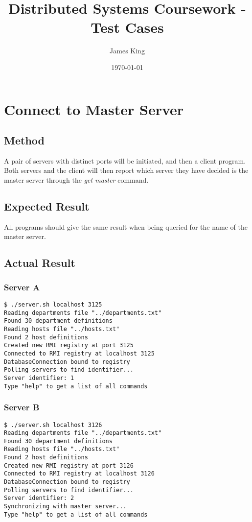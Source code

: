 \documentclass[a4paper,11pt]{article}
\title{Distributed Systems Coursework - Test Cases}
\date{\today}
\author{James King}
\begin{document}
\maketitle
\section{Connect to Master Server}
\subsection{Method}
A pair of servers with distinct ports will be initiated, and then a client program. Both servers and the client will then report which server they have decided is the master server through the \emph{get master} command.

\subsection{Expected Result}
All programs should give the same result when being queried for the name of the master server.

\subsection{Actual Result}
\subsubsection{Server A}
\begin{verbatim}
$ ./server.sh localhost 3125
Reading departments file "../departments.txt"
Found 30 department definitions
Reading hosts file "../hosts.txt"
Found 2 host definitions
Created new RMI registry at port 3125
Connected to RMI registry at localhost 3125
DatabaseConnection bound to registry
Polling servers to find identifier...
Server identifier: 1
Type "help" to get a list of all commands
\end{verbatim}

\subsubsection{Server B}
\begin{verbatim}
$ ./server.sh localhost 3126
Reading departments file "../departments.txt"
Found 30 department definitions
Reading hosts file "../hosts.txt"
Found 2 host definitions
Created new RMI registry at port 3126
Connected to RMI registry at localhost 3126
DatabaseConnection bound to registry
Polling servers to find identifier...
Server identifier: 2
Synchronizing with master server...
Type "help" to get a list of all commands
\end{verbatim}
\end{document}
